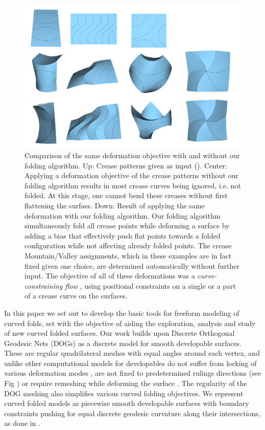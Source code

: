 \begin{figure} [h]
	\centering
	\includegraphics[width=\linewidth]{figures/fold_bias_compare}
	\caption{Comparison of the same deformation objective with and without our folding algorithm. Up: Crease patterns given as input (). Center: Applying a deformation objective of the crease patterns without our folding algorithm results in most crease curves being ignored, i.e. not folded. At this stage, one cannot bend these creases without first flattening the surfaes. Down: Result of applying the same deformation with our folding algorithm. Our folding algorithm simultaneously fold all crease points while deforming a surface by adding a bias that effectively push flat points towards a folded configuration while not affecting already folded points. The crease Mountain/Valley assignments, which in these examples are in fact fixed given one choice, are determined automatically without further input. The objective of all of these deformations was a  \textit{curve-constraining flow} \cite{rabi2018shape}, using positional constraints on a single or a part of a crease curve on the surfaces.}
	\label{fig:folded_and_not_folded}
\end{figure}

In this paper we set out to develop the basic tools for freeform modeling of curved folds, set with the objective of aiding the exploration, analysis and study of new curved folded surfaces. Our work builds upon Discrete Orthogonal Geodesic Nets (DOGs) \cite{rabi18,rabi2018shape} as a discrete model for smooth developable surfaces. These are regular quadrilateral meshes with equal angles around each vertex, and unlike other computational models for developables do not suffer from locking of various deformation modes \cite{locking1,locking2,grin_shells}, are not fixed to predetermined rulings directions \cite{pottmann_new,curved_folding_kilian} (see Fig ) or require remeshing while deforming the surface \cite{StringActuated:2017,SchreckEG2017,Narain}. The regularity of the DOG meshing also simplifies various curved folding objectives. We represent curved folded models as piecewise smooth developable surfaces with boundary constraints pushing for equal discrete geodesic curvature along their intersections, as done in \cite{rabi2018shape}.

